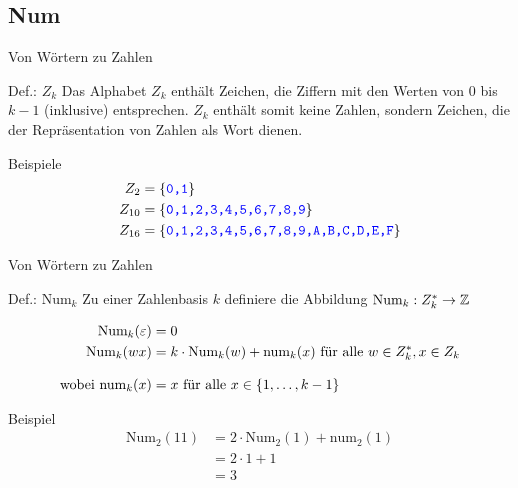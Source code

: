 \subsection{Num}

\begin{frame}{Von Wörtern zu Zahlen}
	
	\begin{block}{Def.: $Z_k$}
		Das Alphabet $Z_k$ enthält Zeichen, die Ziffern mit den Werten von $0$ bis $k-1$ (inklusive) entsprechen. $Z_k$ enthält somit keine Zahlen, sondern Zeichen, die der Repräsentation von Zahlen als Wort dienen.
	\end{block}

	\begin{exampleblock}{Beispiele}
		\begin{align*}
			Z_{2} &= \left\{ \texttt{\textcolor{blue}{0,1}} \right\}\\
			Z_{10} &= \left\{ \texttt{\textcolor{blue}{0,1,2,3,4,5,6,7,8,9}} \right\}\\
			Z_{16} &= \left\{ \texttt{\textcolor{blue}{0,1,2,3,4,5,6,7,8,9,A,B,C,D,E,F}} \right\}
		\end{align*}
	\end{exampleblock}

\end{frame}

\begin{frame}{Von Wörtern zu Zahlen}
	\begin{block}{Def.: $\text{Num}_k$}
		Zu einer Zahlenbasis $k$ definiere die Abbildung $\text{Num}_k : Z_k^* \to \mathbb{Z}$ 

		\begin{align*}
			\text{Num}_k(\varepsilon) &= 0 \\
			\text{Num}_k(wx) &= k\cdot \text{Num}_k(w) + \text{num}_k(x) \text{ für alle } w\in Z_k^*, x\in Z_k\\[2ex]
			\text{wobei }\text{num}_k(x) &= x \text{ für alle } x \in \left\{ 1,\dots,k-1 \right\}
		\end{align*}
	\end{block}
	\pause
	\begin{exampleblock}{Beispiel}
		\begin{align*}
			\text{Num}_2(11) &= 2\cdot \text{Num}_2(1) + \text{num}_2(1) \\
				&= 2\cdot 1 + 1 \\
				&= 3
		\end{align*}
	\end{exampleblock}
\end{frame}

